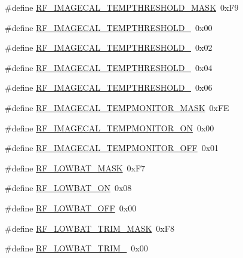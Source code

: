 \begin{DoxyCompactItemize}
\item 
\#define \mbox{\hyperlink{sx1276_regs-_fsk_8h_a71e92b3a6cabbb3c991d406981b0ca4c}{R\+F\+\_\+\+I\+M\+A\+G\+E\+C\+A\+L\+\_\+\+T\+E\+M\+P\+T\+H\+R\+E\+S\+H\+O\+L\+D\+\_\+\+M\+A\+SK}}~0x\+F9
\item 
\#define \mbox{\hyperlink{sx1276_regs-_fsk_8h_a823732f79cd8fdb0e911e9845eefdfc7}{R\+F\+\_\+\+I\+M\+A\+G\+E\+C\+A\+L\+\_\+\+T\+E\+M\+P\+T\+H\+R\+E\+S\+H\+O\+L\+D\+\_}}~0x00
\item 
\#define \mbox{\hyperlink{sx1276_regs-_fsk_8h_ace08ac63033530d1b78d0902d0563095}{R\+F\+\_\+\+I\+M\+A\+G\+E\+C\+A\+L\+\_\+\+T\+E\+M\+P\+T\+H\+R\+E\+S\+H\+O\+L\+D\+\_}}~0x02
\item 
\#define \mbox{\hyperlink{sx1276_regs-_fsk_8h_ac99967aa7133c5de90e00d89cdb2fc31}{R\+F\+\_\+\+I\+M\+A\+G\+E\+C\+A\+L\+\_\+\+T\+E\+M\+P\+T\+H\+R\+E\+S\+H\+O\+L\+D\+\_}}~0x04
\item 
\#define \mbox{\hyperlink{sx1276_regs-_fsk_8h_a15e6175c8004a9070dc082987c16c8f5}{R\+F\+\_\+\+I\+M\+A\+G\+E\+C\+A\+L\+\_\+\+T\+E\+M\+P\+T\+H\+R\+E\+S\+H\+O\+L\+D\+\_}}~0x06
\item 
\#define \mbox{\hyperlink{sx1276_regs-_fsk_8h_ab383d53c5725baec9e3eca281bb1c8ab}{R\+F\+\_\+\+I\+M\+A\+G\+E\+C\+A\+L\+\_\+\+T\+E\+M\+P\+M\+O\+N\+I\+T\+O\+R\+\_\+\+M\+A\+SK}}~0x\+FE
\item 
\#define \mbox{\hyperlink{sx1276_regs-_fsk_8h_af81f91a2ef01cc97f6c0da04fa990513}{R\+F\+\_\+\+I\+M\+A\+G\+E\+C\+A\+L\+\_\+\+T\+E\+M\+P\+M\+O\+N\+I\+T\+O\+R\+\_\+\+ON}}~0x00
\item 
\#define \mbox{\hyperlink{sx1276_regs-_fsk_8h_a88d0a3e79e03d24bc1d0585bb495a8f6}{R\+F\+\_\+\+I\+M\+A\+G\+E\+C\+A\+L\+\_\+\+T\+E\+M\+P\+M\+O\+N\+I\+T\+O\+R\+\_\+\+O\+FF}}~0x01
\item 
\#define \mbox{\hyperlink{sx1276_regs-_fsk_8h_abaff91d450af8669ffd50eb619e28483}{R\+F\+\_\+\+L\+O\+W\+B\+A\+T\+\_\+\+M\+A\+SK}}~0x\+F7
\item 
\#define \mbox{\hyperlink{sx1276_regs-_fsk_8h_ac8bf5b979c71e1fa7ff998f96136001c}{R\+F\+\_\+\+L\+O\+W\+B\+A\+T\+\_\+\+ON}}~0x08
\item 
\#define \mbox{\hyperlink{sx1276_regs-_fsk_8h_a5f220eb10ea52a4dfc62ca4675ddb55f}{R\+F\+\_\+\+L\+O\+W\+B\+A\+T\+\_\+\+O\+FF}}~0x00
\item 
\#define \mbox{\hyperlink{sx1276_regs-_fsk_8h_a668694c9fd9267c3dc4fa53354319ed9}{R\+F\+\_\+\+L\+O\+W\+B\+A\+T\+\_\+\+T\+R\+I\+M\+\_\+\+M\+A\+SK}}~0x\+F8
\item 
\#define \mbox{\hyperlink{sx1276_regs-_fsk_8h_a85288dbdf38735bd011bcdb471e993c7}{R\+F\+\_\+\+L\+O\+W\+B\+A\+T\+\_\+\+T\+R\+I\+M\+\_}}~0x00

\end{DoxyCompactItemize}
